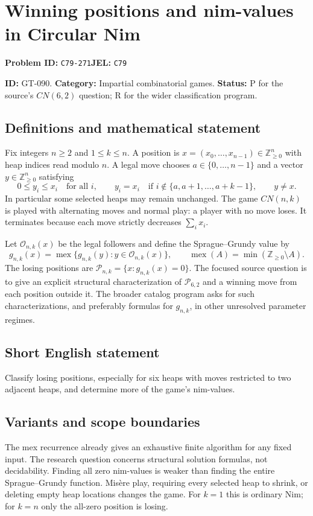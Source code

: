 \documentclass[11pt,a4paper]{article}
\begin{document}
\section*{Winning positions and nim-values in Circular Nim}
\textbf{Problem ID:} \texttt{C79-271}\quad \textbf{JEL:} \texttt{C79}\par
\label{problem:OP-0220}
\label{game:GT-090}
{\sffamily\small\color{muted}
\noindent\textbf{ID:} GT-090. \textbf{Category:} Impartial combinatorial games.
\textbf{Status:} P for the source's $CN(6,2)$ question; R for the wider classification program.
\par}
\subsection*{Definitions and mathematical statement}
Fix integers $n\geq2$ and $1\leq k\leq n$. A position is
$x=(x_0,\ldots,x_{n-1})\in\mathbb Z_{\geq0}^{n}$ with heap indices read modulo $n$. A legal move chooses $a\in\{0,\ldots,n-1\}$ and a vector $y\in\mathbb Z_{\geq0}^{n}$ satisfying
\[
 0\leq y_i\leq x_i\quad\text{for all }i,\qquad
 y_i=x_i\quad\text{if }i\notin\{a,a+1,\ldots,a+k-1\},\qquad y\neq x.
\]
In particular some selected heaps may remain unchanged. The game $CN(n,k)$ is played with alternating moves and normal play: a player with no move loses. It terminates because each move strictly decreases $\sum_i x_i$.

Let $\mathcal O_{n,k}(x)$ be the legal followers and define the Sprague--Grundy value by
\[
 g_{n,k}(x)=\operatorname{mex}\{g_{n,k}(y):y\in\mathcal O_{n,k}(x)\},
 \qquad \operatorname{mex}(A)=\min(\mathbb Z_{\geq0}\setminus A).
\]
The losing positions are $\mathcal P_{n,k}=\{x:g_{n,k}(x)=0\}$. The focused source question is to give an explicit structural characterization of
$\mathcal P_{6,2}$ and a winning move from each position outside it. The broader catalog program asks for such characterizations, and preferably formulas for $g_{n,k}$, in other unresolved parameter regimes.

\subsection*{Short English statement}
Classify losing positions, especially for six heaps with moves restricted to two adjacent heaps, and determine more of the game's nim-values.

\subsection*{Variants and scope boundaries}
The mex recurrence already gives an exhaustive finite algorithm for any fixed input. The research question concerns structural solution formulas, not decidability. Finding all zero nim-values is weaker than finding the entire Sprague--Grundy function. Mis\`ere play, requiring every selected heap to shrink, or deleting empty heap locations changes the game. For $k=1$ this is ordinary Nim; for $k=n$ only the all-zero position is losing.
\end{document}
